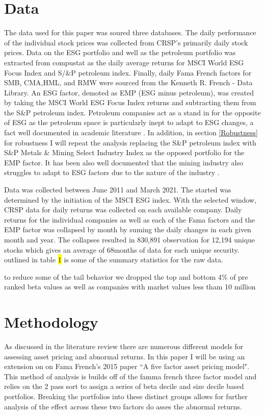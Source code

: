 \documentclass[12pt,oneside,reqno]{amsart}
\begin{document}
\section{Data}
\label{Data}
The data used for this paper was soured three databases. The daily performance of the individual stock prices was collected from CRSP's primarily daily stock prices. Data on the ESG portfolio and well as the petroleum portfolio was extracted from compustat as the daily average returns for MSCI World ESG Focus Index and S/&P petroleum index. Finally, daily Fama French factors for SMB, CMA,HML, and RMW were sourced from the Kenneth R. French - Data Library.  An ESG factor, demoted as EMP (ESG minus petroleum), was created by taking the  MSCI World ESG Focus Index returns and subtracting them from the  S\&P petroleum index. Petroleum companies act as a stand in for the opposite of ESG as the  petroleum space is particularly inept to adapt to ESG  changes, a fact well documented in academic literature \cite{Frynas2005TheFD}. In addition, in section \ref{Robustness} for robustness I will repeat the analysis replacing the  S\&P petroleum index with S\&P Metals & Mining Select Industry Index as the opposed portfolio for the EMP factor. It has been also well documented that the mining industry also struggles to adapt to ESG factors due to the nature of the industry \cite{Kapelus2002MiningCS}.
 
 
 Data was collected between June 2011 and March 2021. The started was determined by the initiation of the MSCI ESG index. With the selected window, CRSP data for daily returns was collected on each available company. Daily returns for the individual companies as well as each of the Fama factors and the EMP factor was collapsed by month by suming the daily changes in each given month and year. The collapses resulted in 830,891 observation for 12,194 unique stocks which gives an average of 68months of data for each unique security.  outlined in table \hl{1} is some of the summary statistics for the raw data.

to reduce some of the tail behavior we dropped the top and bottom  4\% of pre ranked beta values as well as companies with market values less tham 10 million
\section{Methodology}
\label{Methodology}
As discussed in the literature review there are numerous different models for assessing asset pricing and abnormal returns. In this paper I will be using an extension on on Fama French's 2015 paper ``A five factor asset pricing model". This method of analysis is builds off of the famma french three factor model and relies on the 2 pass sort to assign a series of beta decile and size decile based portfolios. Breaking the portfolios into these distinct groups allows for further analysis of the effect across these two factors do asses the abnormal returns. 
\end{document}
